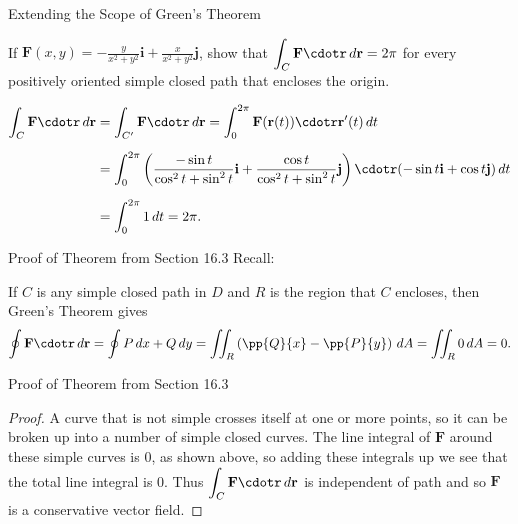 \documentclass[11pt,english,
handout
]{beamer}
\begin{document}
\begin{frame}[t]{Extending the Scope of Green's Theorem}
\small
\begin{example}
If $\displaystyle \mathbf{F}(x,y)=-\frac{y}{x^2+y^2}\mathbf{i}+\frac{x}{x^2+y^2}\mathbf{j}$, show that $\displaystyle \int_C\mathbf{F}\cdotr\,d\mathbf{r}=2\pi$ for every positively oriented simple closed path that encloses the origin.

\lspace
\begin{align*}
\int_C\mathbf{F}\cdotr\,d\mathbf{r}&=\int_{C'}\mathbf{F}\cdotr\,d\mathbf{r}=\int_0^{2\pi}\mathbf{F}(\mathbf{r}(t))\cdotr\mathbf{r}'(t)\,dt\\[2mm]
&=\int_0^{2\pi}\left(\frac{-\sin t}{\cos^2t+\sin^2t}\mathbf{i}+\frac{\cos t}{\cos^2t+\sin^2t}\mathbf{j}\right)\cdotr(-\sin t\mathbf{i}+\cos t\mathbf{j})\,dt\\[2mm]
&=\int_0^{2\pi}1\,dt=2\pi.
\end{align*}
\end{example}
\end{frame}










\begin{frame}[t]{Proof of Theorem from Section 16.3}
\small
Recall:

\pause 

\lspace
\begin{proofs}
If $C$ is any simple closed path in $D$ and $R$ is the region that $C$ encloses, then Green's Theorem gives
\[
\oint\mathbf{F}\cdotr\,d\mathbf{r}=\oint P\,dx+Q\,dy=\iint_R\left(\pp{Q}{x}-\pp{P}{y}\right)\,dA=\iint_R0\,dA=0.
\]
\end{proofs}
\end{frame}









\begin{frame}{Proof of Theorem from Section 16.3}
\small
\begin{proof}
A curve that is not simple crosses itself at one or more points, so it can be broken up into a number of simple closed curves. The line integral of $\mathbf{F}$ around these simple curves is 0, as shown above, so adding these integrals up we see that the total line integral is 0. Thus $\displaystyle \int_C\mathbf{F}\cdotr\,d\mathbf{r}$ is independent of path and so $\mathbf{F}$ is a conservative vector field.
\end{proof}
\end{frame}
\end{document}
